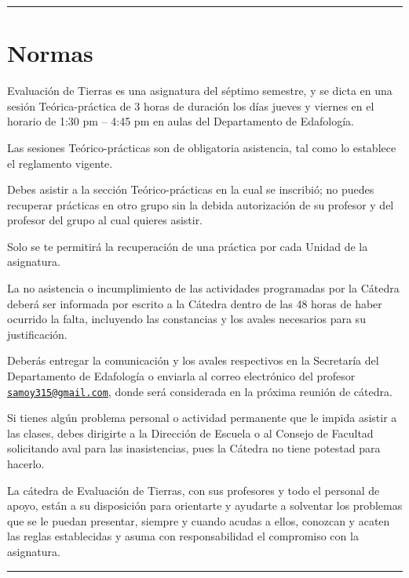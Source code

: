 \documentclass[
]{book}
\begin{document}
\begin{center}\rule{0.5\linewidth}{0.5pt}\end{center}

\hypertarget{normas}{%
\section*{Normas}\label{normas}}

Evaluación de Tierras es una asignatura del séptimo semestre, y se dicta en una sesión Teórica-práctica de 3 horas de duración los días jueves y viernes en el horario de 1:30 pm -- 4:45 pm en aulas del Departamento de Edafología.

Las sesiones Teórico-prácticas son de obligatoria asistencia, tal como lo establece el reglamento vigente.

Debes asistir a la sección Teórico-prácticas en la cual se inscribió; no puedes recuperar prácticas en otro grupo sin la debida autorización de su profesor y del profesor del grupo al cual quieres asistir.

Solo se te permitirá la recuperación de una práctica por cada Unidad de la asignatura.

La no asistencia o incumplimiento de las actividades programadas por la Cátedra deberá ser informada por escrito a la Cátedra dentro de las 48 horas de haber ocurrido la falta, incluyendo las constancias y los avales necesarios para su justificación.

Deberás entregar la comunicación y los avales respectivos en la Secretaría del Departamento de Edafología o enviarla al correo electrónico del profesor \href{mailto:samoy315@gmail.com}{\nolinkurl{samoy315@gmail.com}}, donde será considerada en la próxima reunión de cátedra.

Si tienes algún problema personal o actividad permanente que le impida asistir a las clases, debes dirigirte a la Dirección de Escuela o al Consejo de Facultad solicitando aval para las inasistencias, pues la Cátedra no tiene potestad para hacerlo.

La cátedra de Evaluación de Tierras, con sus profesores y todo el personal de apoyo, están a su disposición para orientarte y ayudarte a solventar los problemas que se le puedan presentar, siempre y cuando acudas a ellos, conozcan y acaten las reglas establecidas y asuma con responsabilidad el compromiso con la asignatura.

\begin{center}\rule{0.5\linewidth}{0.5pt}\end{center}
\end{document}
